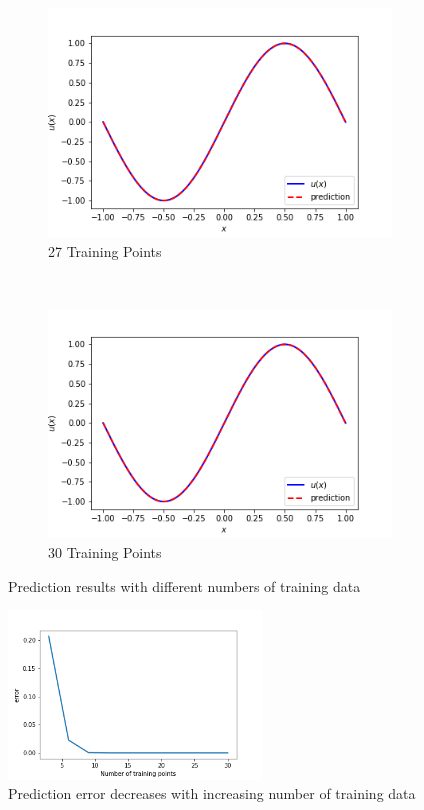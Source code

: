 \documentclass{article}
\begin{document}
\begin{figure}[htbp]
\begin{subfigure}{0.45\textwidth}
        \includegraphics[width=\textwidth]{figures/27TrainingPoints}
        \caption{27 Training Points}
    \end{subfigure}
        ~ %
    \begin{subfigure}{0.45\textwidth}
        \includegraphics[width=\textwidth]{figures/30TrainingPoints}
        \caption{30 Training Points}
    \end{subfigure}
    \caption{Prediction results with different numbers of training data}

\end{figure}

\begin{figure}
    \center
    \includegraphics[width=0.6\textwidth]{figures/error.png}
    \caption{Prediction error decreases with increasing number of training data}
\end{figure}
\end{document}

